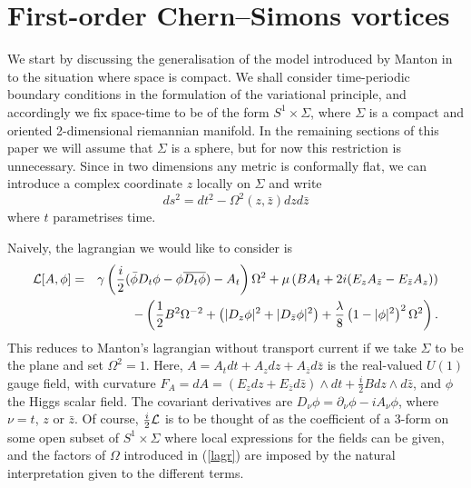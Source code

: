 \documentclass[a4paper,11pt]{article}
\begin{document}
\section{First-order Chern--Simons vortices}


We start by discussing the generalisation of the model introduced by
Manton in \cite{Mfovd} to the situation where space is compact. We
shall consider time-periodic boundary conditions in the formulation of
the variational principle, and accordingly we fix space-time to be of 
the form $S^{1} \times \Sigma$, where $\Sigma$ is a compact and oriented
2-dimensional riemannian manifold. 
In the remaining sections of this paper we will assume that $\Sigma$ 
is a sphere, but for now this restriction is unnecessary.
Since in two dimensions any metric is conformally
flat, we can introduce a complex coordinate $z$ locally on $\Sigma$
and write
\begin{equation}\label{metric}
ds^{2} = dt^{2}-\Omega^{2}(z,\bar{z})dzd\bar{z}
\end{equation}
where $t$ parametrises time.


Naively, the lagrangian we would like to consider is
\begin{eqnarray} \label{lagr}
{\cal L} [A,\phi] & = & \gamma
\left(\frac{i}{2}(\bar{\phi}D_{t}\phi-\phi\overline{D_{t}\phi})
-A_{t}\right)\Omega^{2}
+\mu\left( B A_{t}+2i(E_{z}A_{\bar{z}}-E_{\bar{z}}A_{z})  \right)\\ \nonumber
& & -\left(\frac{1}{2} B^{2}\Omega^{-2}
+ \left(|D_{z}\phi|^{2}+ |D_{\bar{z}}\phi|^{2}\right)
+\frac{\lambda}{8}\left( 1-|\phi|^{2}\right) ^{2}\Omega^{2}\right).
\end{eqnarray}
This reduces to Manton's lagrangian \cite{Mfovd} without transport current
if we take $\Sigma$ to be the plane and set $\Omega^{2}=1$. 
Here, $A=A_{t}dt+A_{z}dz+A_{\bar{z}}d\bar{z}$ is the real-valued
$U(1)$ gauge field, with curvature 
$F_{A}=dA=(E_{z}dz+E_{\bar{z}}d\bar{z}) \wedge 
dt+\frac{i}{2}Bdz\wedge d\bar{z}$, and $\phi$ the Higgs scalar field.
The covariant derivatives are 
$D_{\nu}\phi=\partial_{\nu}\phi-iA_{\nu}\phi$, where
$\nu=t$, $z$ or $\bar{z}$.
Of course, $\frac{i}{2}{\cal L}$ is to be thought of as the coefficient of a
3-form on some open subset of $S^{1} \times \Sigma$ where local expressions 
for the fields can be given, and the factors of $\Omega$ introduced in
(\ref{lagr}) are imposed by the natural interpretation given to the 
different terms. 
\end{document}
